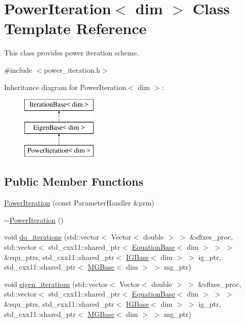 \hypertarget{class_power_iteration}{}\section{Power\+Iteration$<$ dim $>$ Class Template Reference}
\label{class_power_iteration}


This class provides power iteration scheme.  




{\ttfamily \#include $<$power\+\_\+iteration.\+h$>$}

Inheritance diagram for Power\+Iteration$<$ dim $>$\+:\begin{figure}[H]
\begin{center}
\leavevmode
\includegraphics[height=3.000000cm]{class_power_iteration}
\end{center}
\end{figure}
\subsection*{Public Member Functions}
\begin{DoxyCompactItemize}
\item 
\hyperlink{class_power_iteration_a2608445223ce7d27b24be0f9d7042554}{Power\+Iteration} (const Parameter\+Handler \&prm)
\item 
\hyperlink{class_power_iteration_ad660a351afc4f23b1bcf7b334ef033dd}{$\sim$\+Power\+Iteration} ()
\item 
void \hyperlink{class_power_iteration_a7a87263df0f1ca9e01f2647cd91461ed}{do\+\_\+iterations} (std\+::vector$<$ Vector$<$ double $>$ $>$ \&sflxes\+\_\+proc, std\+::vector$<$ std\+\_\+cxx11\+::shared\+\_\+ptr$<$ \hyperlink{class_equation_base}{Equation\+Base}$<$ dim $>$ $>$ $>$ \&equ\+\_\+ptrs, std\+\_\+cxx11\+::shared\+\_\+ptr$<$ \hyperlink{class_i_g_base}{I\+G\+Base}$<$ dim $>$ $>$ ig\+\_\+ptr, std\+\_\+cxx11\+::shared\+\_\+ptr$<$ \hyperlink{class_m_g_base}{M\+G\+Base}$<$ dim $>$ $>$ mg\+\_\+ptr)
\item 
void \hyperlink{class_power_iteration_a583586002126f8b7a523e95327047cba}{eigen\+\_\+iterations} (std\+::vector$<$ Vector$<$ double $>$ $>$ \&sflxes\+\_\+proc, std\+::vector$<$ std\+\_\+cxx11\+::shared\+\_\+ptr$<$ \hyperlink{class_equation_base}{Equation\+Base}$<$ dim $>$ $>$ $>$ \&equ\+\_\+ptrs, std\+\_\+cxx11\+::shared\+\_\+ptr$<$ \hyperlink{class_i_g_base}{I\+G\+Base}$<$ dim $>$ $>$ ig\+\_\+ptr, std\+\_\+cxx11\+::shared\+\_\+ptr$<$ \hyperlink{class_m_g_base}{M\+G\+Base}$<$ dim $>$ $>$ mg\+\_\+ptr)
\end{DoxyCompactItemize}
